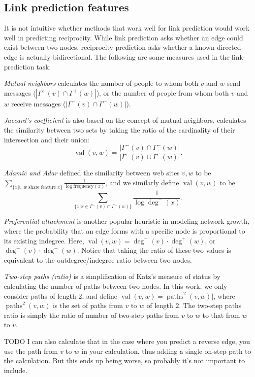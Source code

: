 \documentclass[conference]{IEEEtran}
\begin{document}
\subsection{Link prediction features}
It is not intuitive whether methods that work well for link prediction would work well in predicting reciprocity. 
While link prediction asks whether an edge could exist between two nodes, reciprocity prediction asks whether a known directed-edge is actually bidirectional.
The following are some measures used in the link-prediction task:

\emph{Mutual neighbors} calculates the number of people to whom both $v$ and $w$ send messages ($|\Gamma^+(v) \cap \Gamma^+(w)|$), or the number of people from whom both $v$ and $w$ receive messages ($|\Gamma^-(v) \cap \Gamma^-(w)|$).

\emph{Jaccard's coefficient} is also based on the concept of mutual neighbors, calculates the similarity between two sets by taking the ratio of the cardinality of their intersection and their union: \[\operatorname{val}(v,w) = \frac{|\Gamma^-(v) \cap \Gamma^-(w)|}{|\Gamma^-(v) \cup \Gamma^-(w)|}.\]

\emph{Adamic and Adar} \cite{Adamic:2003ud} defined the similarity between web sites $v,w$ to be $ \sum_{\{x|v,w \text{ share feature }x\}} \frac{1}{\log{\text{frequency}(x)}} $, and we similarly define $\operatorname{val}(v,w)$ to be \[ \sum_{\{x|x \in \Gamma^-(v) \cap \Gamma^-(w)\}} \frac{1}{\log{\deg^-(x)}} .\]

\emph{Preferential attachment} is another popular heuristic in modeling network growth, where the probability that an edge forms with a specific node is proportional to its existing indegree. 
Here, $\operatorname{val}(v,w) = \deg^-(v)\cdot \deg^+(w)$, or $\deg^+(v)\cdot \deg^-(w)$. 
Notice that taking the ratio of these two values is equivalent to the outdegree/indegree ratio between two nodes.

\emph{Two-step paths (ratio)} is a simplification of Katz's \cite{Katz:1953un} measure of status by calculating the number of paths between two nodes. 
In this work, we only consider paths of length 2, and define $\operatorname{val}(v,w) = \operatorname{paths}^2(v,w)|$, where $\operatorname{paths}^2(v,w)$ is the set of paths from $v$ to $w$ of length $2$. 
The two-step paths ratio is simply the ratio of number of two-step paths from $v$ to $w$ to that from $w$ to $v$. 

TODO I can also calculate that in the case where you predict a reverse edge, you use the path from $v$ to $w$ in your calculation, thus adding a single on-step path to the calculation. 
But this ends up being worse, so probably it's not important to include.
\end{document}
